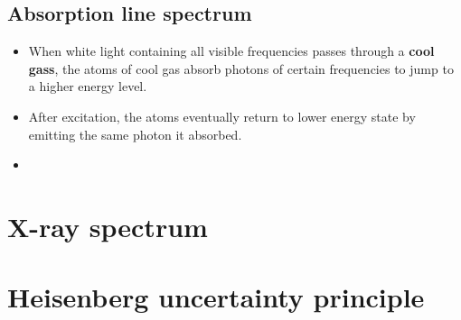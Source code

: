 \documentclass[a4paper, 10pt]{article}
\begin{document}
\subsection{Absorption line spectrum}

\begin{itemize}
   \item When white light containing all visible frequencies passes through a \textbf{cool gass}, the atoms of cool gas absorb photons of certain frequencies to jump to a higher energy level. 
   \item After excitation, the atoms eventually return to lower energy state by emitting the same photon it absorbed. 
   \item
\end{itemize}	













\section{X-ray spectrum}
\section{Heisenberg uncertainty principle}
\end{document}
